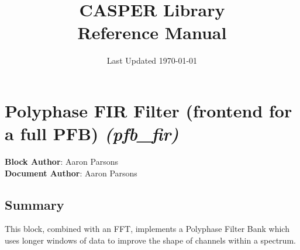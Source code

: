 \documentclass{article}
\title{\textbf{CASPER Library} \\Reference Manual}
\date{Last Updated \today}
\newcommand{\Block}[6]{\section {#1 \emph{(#2)}} \label{#3} \textbf{Block Author}: #4 \\ \textbf{Document Author}: #5 \subsection*{Summary}#6}
\begin{document}
\maketitle


%
\Block{Polyphase FIR Filter (frontend for a full PFB)}
{pfb\_fir}
{pfbfir}
{Aaron Parsons}
{Aaron Parsons}
{This block, combined with an FFT, implements a Polyphase Filter Bank which uses longer windows of data to improve the shape of channels within a spectrum.}
\end{document}
